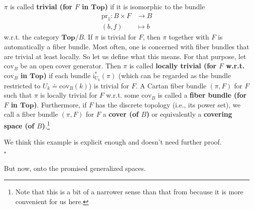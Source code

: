 \begin{exa}[Bundles 1]
$\pi$ is called \textbf{trivial (for $F$ in $\mathbf{Top}$)} if it is isomorphic to the bundle
\begin{align*}
  \mathrm{pr}_{1}
  \colon
  B
  \times
  F
  &\rightarrow
  B
  \\
  (b,f)
  &\mapsto
  b
\end{align*}
w.r.t. the category $\mathbf{Top} \slash B$.
If $\pi$ is trivial for $F$, then $\pi$ together with $F$ is automatically a fiber bundle.
Most often, one is concerned with fiber bundles that are trivial at least locally.
So let us define what this means.
For that purpose, let $\mathrm{cov}_{B}$ be an open cover generator.
Then $\pi$ is called \textbf{locally trivial (for $F$ w.r.t. $\mathrm{cov}_{B}$ in $\mathbf{Top}$)} if each bundle $\mathrm{i}_{U_{k}}^{\ast}(\pi)$ (which can be regarded as the bundle restricted to $U_{k} \doteq \mathrm{cov}_{B}(k)$) is trivial for $F$.
A Cartan fiber bundle $(\pi,F)$ for $F$ such that $\pi$ is locally trivial for $F$ w.r.t. some $\mathrm{cov}_{B}$ is called a \textbf{fiber bundle (for $F$ in $\mathbf{Top}$)}.
Furthermore, if $F$ has the discrete topology (i.e., its power set), we call a fiber bundle $(\pi,F)$ for $F$ a \textbf{cover (of $B$)} or equivalently a \textbf{covering space (of $B$)}.\footnote{Note that this is a bit of a narrower sense than that from \cite{8b5861fc} because it is more convenient for us here.}
\end{exa}
\begin{prf}
We think this example is explicit enough and doesn't need further proof.
\\
\phantom{proven}
\hfill
$\square$
\end{prf}
But now, onto the promised generalized spaces.
\\
